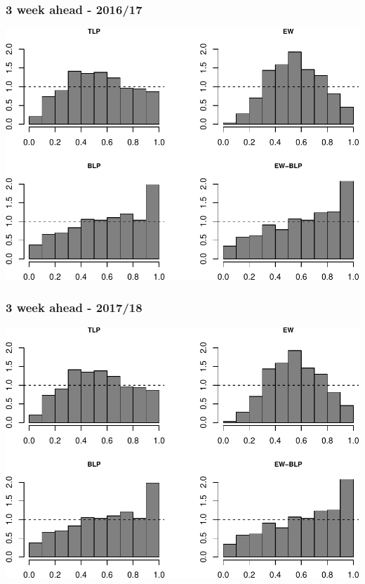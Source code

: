 \documentclass[]{article}
\begin{document}
\hypertarget{week-ahead---201617-2}{%
\subsubsection{3 week ahead - 2016/17}\label{week-ahead---201617-2}}

\includegraphics{BLPcalibration_app_files/figure-latex/unnamed-chunk-10-1.pdf}

\hypertarget{week-ahead---201718-2}{%
\subsubsection{3 week ahead - 2017/18}\label{week-ahead---201718-2}}

\includegraphics{BLPcalibration_app_files/figure-latex/unnamed-chunk-11-1.pdf}
\end{document}
